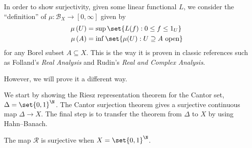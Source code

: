 \documentclass[10pt]{mypackage}
\begin{document}
In order to show surjectivity, given some linear functional $L$, we consider the ``definition'' of $\mu\colon \mathcal{B}_X\to [0,\infty]$ given by
\begin{align*}
  \mu\left( U \right) &= \sup\set{L(f) : 0\leq f \leq 1_U}\\
  \mu\left( A \right) &= \inf\set{\mu(U) : U\supseteq A\text{ open}}
\end{align*}
for any Borel subset $A\subseteq X$. This is the way it is proven in classic references such as Folland's \textit{Real Analysis} and Rudin's \textit{Real and Complex Analysis}.

However, we will prove it a different way.

We start by showing the Riesz representation theorem for the Cantor set, $\Delta = \set{0,1}^{\N}$. The Cantor surjection theorem gives a surjective continuous map $\Delta\to X$. The final step is to transfer the theorem from $\Delta$ to $X$ by using Hahn--Banach.
\begin{theorem}
  The map $ \mathcal{R} $ is surjective when $X = \set{0,1}^{\N}$.
\end{theorem}
\end{document}
